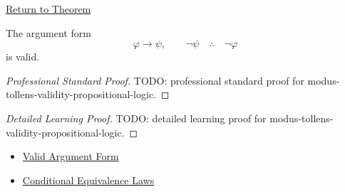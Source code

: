 \newpage
{}
\label{prf:modus-tollens-validity-propositional-logic}

\begin{remark*}[Return]
\hyperref[thm:modus-tollens-validity-propositional-logic]{Return to Theorem}
\end{remark*}

\begin{theorem*}
The argument form
\[
\varphi\to\psi,\qquad \neg\psi \quad\therefore\quad \neg\varphi
\]
is valid.
\end{theorem*}

\begin{proof}[Professional Standard Proof]
\LRAProofBodyStart
TODO: professional standard proof for modus-tollens-validity-propositional-logic.
\end{proof}

\begin{proof}[Detailed Learning Proof]
\LRAProofBodyStart
TODO: detailed learning proof for modus-tollens-validity-propositional-logic.
\end{proof}

\begin{remark*}
\end{remark*}

\begin{dependencies}
\begin{itemize}
  \item \hyperref[def:valid-argument-form-propositional-logic]{Valid Argument Form}
  \item \hyperref[thm:conditional-equivalence-laws-propositional-logic]{Conditional Equivalence Laws}
\end{itemize}
\end{dependencies}

\clearpage
